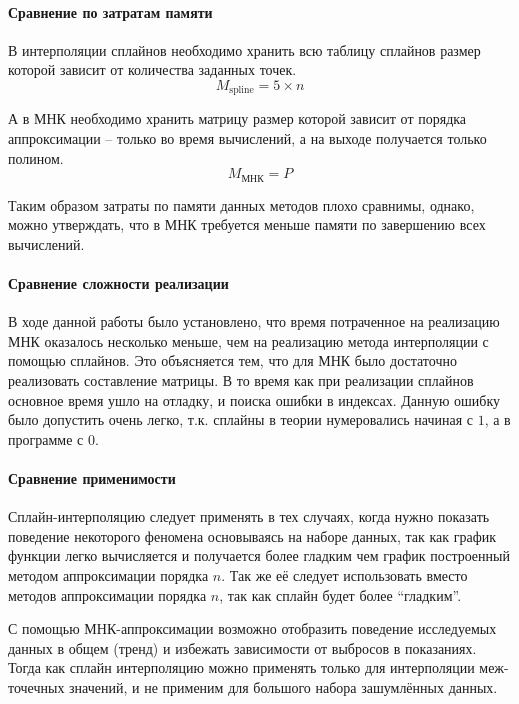 \documentclass[a4paper]{article}
\begin{document}
\paragraph{Сравнение по затратам памяти}
В интерполяции сплайнов необходимо хранить всю таблицу сплайнов размер которой зависит от количества заданных точек.
\begin{equation}
    M_{\text{spline}} = 5 \times n
\end{equation}

А в МНК необходимо хранить матрицу размер которой зависит от порядка аппроксимации -- только во время вычислений, а на выходе получается только полином.
\begin{equation}
    M_{\text{МНК}} = P
\end{equation}

Таким образом затраты по памяти данных методов плохо сравнимы, однако, можно утверждать, что в МНК требуется меньше памяти по завершению всех вычислений.

\paragraph{Сравнение сложности реализации}
В ходе данной работы было установлено, что время потраченное на реализацию МНК оказалось несколько меньше, чем на реализацию метода интерполяции с помощью сплайнов. Это объясняется тем, что для МНК было достаточно реализовать составление матрицы. В то время как при реализации сплайнов основное время ушло на отладку, и поиска ошибки в индексах. Данную ошибку было допустить очень легко, т.к. сплайны в теории нумеровались начиная с $1$, а в программе с $0$.

\paragraph{Сравнение применимости}
Сплайн-интерполяцию следует применять в тех случаях, когда нужно показать поведение некоторого феномена основываясь на наборе данных, так как график функции легко вычисляется и получается более гладким чем график построенный методом аппроксимации порядка $n$. Так же её следует использовать вместо методов аппроксимации порядка $n$, так как сплайн будет более ``гладким''.

С помощью МНК-аппроксимации возможно отобразить поведение исследуемых данных в общем (тренд) и избежать зависимости от выбросов в показаниях. Тогда как сплайн интерполяцию можно применять только для интерполяции меж-точечных значений, и не применим для большого набора зашумлённых данных.
\end{document}

